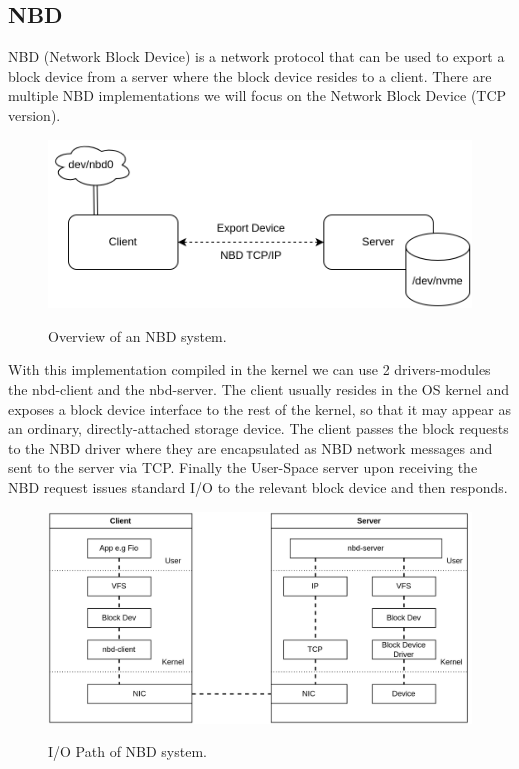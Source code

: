 \subsection{NBD}
  NBD (Network Block Device) is a network protocol that can be used to export a block device from a server where the block device resides to a client. There are multiple NBD implementations we will focus on the Network Block Device (TCP version). 
\begin{figure}[h]
\includegraphics[scale=0.3]{figures/nbd-path.png}\\
\caption{Overview of an NBD system.}
\end{figure}
  With this implementation compiled in the kernel we can use 2 drivers-modules the nbd-client and the nbd-server. The client usually resides in the OS kernel and exposes a block device interface to the rest of the kernel, so that it may appear as an ordinary, directly-attached storage device. The client passes the block requests to the NBD driver where they are encapsulated as NBD network messages and sent to the server via TCP. Finally the User-Space server upon receiving the NBD request issues standard I/O to the relevant block device and then responds.
\begin{figure}[h]
\includegraphics[scale=0.25]{figures/nbd-path2.png}\\
\caption{I/O Path of NBD system.}
\end{figure}

